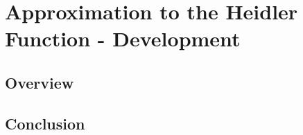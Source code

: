 
\chapter{Approximation to the Heidler Function - Development} %

\label{AppendixDev} %



\section{Overview}
\label{sec:app_math_overview}




\section{Conclusion}
\label{sec:app_math_conclusion}
